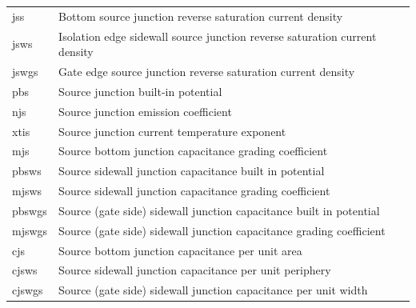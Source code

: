 \begin{longtable}{l l}
{\small jss} & {\small Bottom source junction reverse saturation current density} \\
{\small jsws} & {\small Isolation edge sidewall source junction reverse saturation current density} \\
{\small jswgs} & {\small Gate edge source junction reverse saturation current density} \\
{\small pbs} & {\small Source junction built-in potential} \\
{\small njs} & {\small Source junction emission coefficient} \\
{\small xtis} & {\small Source junction current temperature exponent} \\
{\small mjs} & {\small Source bottom junction capacitance grading coefficient} \\
{\small pbsws} & {\small Source sidewall junction capacitance built in potential} \\
{\small mjsws} & {\small Source sidewall junction capacitance grading coefficient} \\
{\small pbswgs} & {\small Source (gate side) sidewall junction capacitance built in potential} \\
{\small mjswgs} & {\small Source (gate side) sidewall junction capacitance grading coefficient} \\
{\small cjs} & {\small Source bottom junction capacitance per unit area} \\
{\small cjsws} & {\small Source sidewall junction capacitance per unit periphery} \\
{\small cjswgs} & {\small Source (gate side) sidewall junction capacitance per unit width} \\


\end{longtable}
